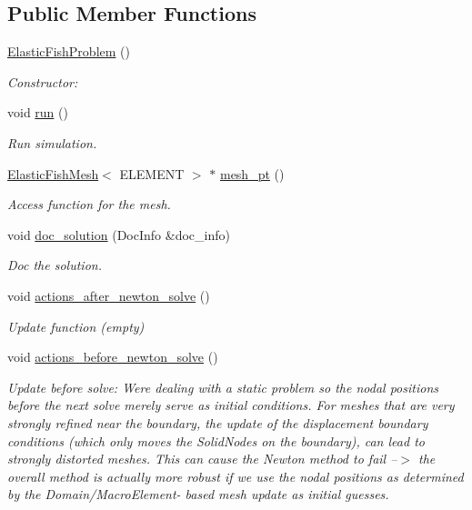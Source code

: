 \subsection*{Public Member Functions}
\begin{DoxyCompactItemize}
\item 
\hyperlink{classElasticFishProblem_adf9fdb0b94ac76b7fdb34bc7fa809a41}{Elastic\+Fish\+Problem} ()
\begin{DoxyCompactList}\small\item\em Constructor\+: \end{DoxyCompactList}\item 
void \hyperlink{classElasticFishProblem_aaaf23036d8f282cff88e497ad214237f}{run} ()
\begin{DoxyCompactList}\small\item\em Run simulation. \end{DoxyCompactList}\item 
\hyperlink{classElasticFishMesh}{Elastic\+Fish\+Mesh}$<$ E\+L\+E\+M\+E\+NT $>$ $\ast$ \hyperlink{classElasticFishProblem_a616c07228c52c594f90dfb1333015712}{mesh\+\_\+pt} ()
\begin{DoxyCompactList}\small\item\em Access function for the mesh. \end{DoxyCompactList}\item 
void \hyperlink{classElasticFishProblem_a5cd7dbd2bc99ccf850c1a58d0b401979}{doc\+\_\+solution} (Doc\+Info \&doc\+\_\+info)
\begin{DoxyCompactList}\small\item\em Doc the solution. \end{DoxyCompactList}\item 
void \hyperlink{classElasticFishProblem_a41badf8aa60bf52d888338039168fcb3}{actions\+\_\+after\+\_\+newton\+\_\+solve} ()
\begin{DoxyCompactList}\small\item\em Update function (empty) \end{DoxyCompactList}\item 
void \hyperlink{classElasticFishProblem_a7c22fcff8d94166797e87d70017540d6}{actions\+\_\+before\+\_\+newton\+\_\+solve} ()
\begin{DoxyCompactList}\small\item\em Update before solve\+: We\textquotesingle{}re dealing with a static problem so the nodal positions before the next solve merely serve as initial conditions. For meshes that are very strongly refined near the boundary, the update of the displacement boundary conditions (which only moves the Solid\+Nodes {\itshape on} the boundary), can lead to strongly distorted meshes. This can cause the Newton method to fail --$>$ the overall method is actually more robust if we use the nodal positions as determined by the Domain/\+Macro\+Element-\/ based mesh update as initial guesses. \end{DoxyCompactList}\item 

\end{DoxyCompactItemize}

